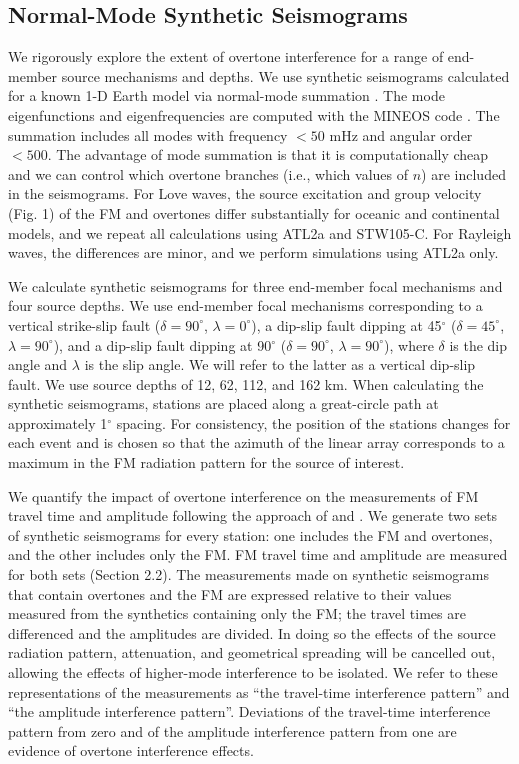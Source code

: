 \documentclass[extra,mreferee]{gji}
\begin{document}
\subsection{Normal-Mode Synthetic Seismograms }
We rigorously explore the extent of overtone interference for a range of end-member source mechanisms and depths. We use synthetic seismograms calculated for a known 1-D Earth model via normal-mode summation \citep{gilbert1971excitation}. The mode eigenfunctions and eigenfrequencies are computed with the MINEOS code \citep{mineosbro}. The summation includes all modes with frequency $< 50$ mHz and angular order $< 500$. The advantage of mode summation is that it is computationally cheap and we can control which overtone branches (i.e., which values of $n$) are included in the seismograms.
For Love waves, the source excitation and group velocity (Fig. 1) of the FM and overtones differ substantially  for oceanic and continental models, and we repeat all calculations using ATL2a and STW105-C. For Rayleigh waves, the differences are minor, and we perform simulations using ATL2a only. 

We calculate synthetic seismograms for three end-member focal mechanisms and four source depths. We use end-member focal mechanisms corresponding to a vertical strike-slip fault ($\delta=90^\circ$, $\lambda=0^\circ$), a dip-slip fault dipping at 45$^\circ$ ($\delta=45^\circ$, $\lambda=90^\circ$), and a dip-slip fault dipping at 90$^\circ$ ($\delta=90^\circ$, $\lambda=90^\circ$), where $\delta$ is the dip angle and $\lambda$ is the slip angle. We will refer to the latter as a vertical dip-slip fault. We use source depths of 12, 62, 112, and 162 km. When calculating the synthetic seismograms, stations are placed along a great-circle path at approximately 1$^\circ$ spacing. For consistency, the position of the stations changes for each event and is chosen so that the azimuth of the linear array corresponds to a maximum in the FM radiation pattern for the source of interest. 

We quantify the impact of overtone interference on the measurements of FM travel time and amplitude following the approach of \citet{hariharan2020evidence} and \citet{foster2014overtone}. We generate two sets of synthetic seismograms for every station: one includes the FM and overtones, and the other includes only the FM. FM travel time and amplitude are measured for both sets (Section 2.2). The measurements made on synthetic seismograms that contain overtones and the FM are  expressed relative to their values measured from the synthetics containing only
the FM; the travel times are differenced and the amplitudes are divided. In doing so the effects of the source radiation pattern, attenuation, and geometrical
spreading will be cancelled out, allowing the effects of higher-mode interference to be isolated. We refer to these representations of the measurements as ``the travel-time interference pattern'' and ``the amplitude interference pattern''. Deviations of the travel-time interference pattern from zero and of the amplitude interference pattern from one are evidence of overtone interference effects.
\end{document}
